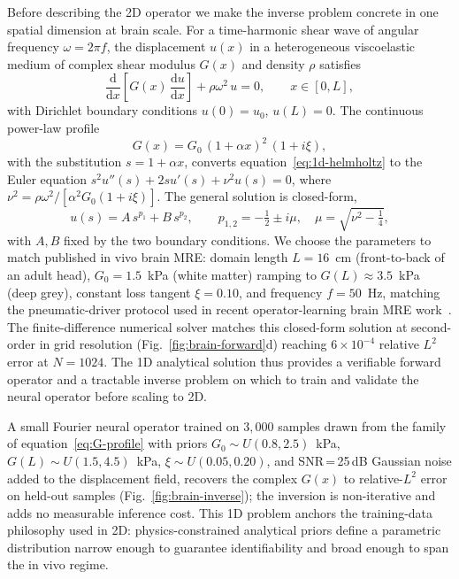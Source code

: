 \documentclass[11pt,letterpaper]{article}
\begin{document}
Before describing the 2D operator we make the inverse problem concrete in
one spatial dimension at brain scale. For a time-harmonic shear wave of
angular frequency $\omega=2\pi f$, the displacement $u(x)$ in a
heterogeneous viscoelastic medium of complex shear modulus $G(x)$ and
density $\rho$ satisfies
\begin{equation}
\frac{\mathrm{d}}{\mathrm{d}x}\!\left[ G(x)\,\frac{\mathrm{d}u}{\mathrm{d}x}\right]
+ \rho\omega^{2}\,u = 0,
\qquad x\in[0,L],
\label{eq:1d-helmholtz}
\end{equation}
with Dirichlet boundary conditions $u(0)=u_{0}$, $u(L)=0$. The continuous
power-law profile
\begin{equation}
G(x) = G_{0}\,(1+\alpha x)^{2}\,(1+i\xi),
\label{eq:G-profile}
\end{equation}
with the substitution $s = 1+\alpha x$, converts
equation~\eqref{eq:1d-helmholtz} to the Euler equation
$s^{2}u''(s) + 2 s u'(s) + \nu^{2}u(s) = 0$, where
$\nu^{2}=\rho\omega^{2}/[\alpha^{2}G_{0}(1+i\xi)]$. The general solution
is closed-form,
\begin{equation}
u(s) = A\,s^{p_{1}} + B\,s^{p_{2}},\qquad
p_{1,2} = -\tfrac{1}{2}\pm i\mu,\quad
\mu = \sqrt{\nu^{2}-\tfrac{1}{4}},
\label{eq:1d-general}
\end{equation}
with $A,B$ fixed by the two boundary conditions. We choose the parameters
to match published in vivo brain MRE: domain length
$L=16$~cm (front-to-back of an adult head),
$G_{0}=1.5$~kPa (white matter) ramping to $G(L)\!\approx\!3.5$~kPa (deep
grey), constant loss tangent $\xi=0.10$, and frequency $f=50$~Hz, matching
the pneumatic-driver protocol used in recent operator-learning brain MRE
work~\cite{herasrivera2025onli}. The finite-difference numerical solver
matches this closed-form solution at second-order in grid resolution
(Fig.~\ref{fig:brain-forward}d) reaching $6\!\times\!10^{-4}$ relative
$L^{2}$ error at $N=1024$. The 1D analytical solution thus provides a
verifiable forward operator and a tractable inverse problem on which to
train and validate the neural operator before scaling to 2D.

A small Fourier neural operator trained on $3{,}000$ samples drawn from
the family of equation~\eqref{eq:G-profile} with priors
$G_{0}\!\sim\!U(0.8,2.5)$~kPa, $G(L)\!\sim\!U(1.5,4.5)$~kPa,
$\xi\!\sim\!U(0.05,0.20)$, and SNR\,=\,25\,dB Gaussian noise added to the
displacement field, recovers the complex $G(x)$ to relative-$L^{2}$ error
on held-out samples (Fig.~\ref{fig:brain-inverse}); the inversion is
non-iterative and adds no measurable inference cost. This 1D problem
anchors the training-data philosophy used in 2D: physics-constrained
analytical priors define a parametric distribution narrow enough to
guarantee identifiability and broad enough to span the in vivo regime.
\end{document}
